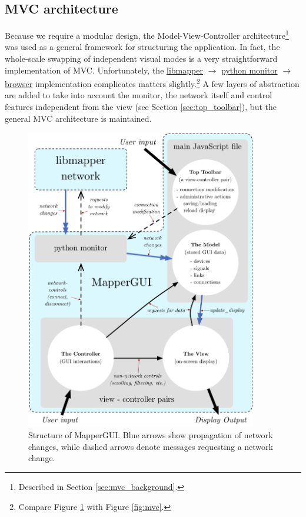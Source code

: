 	\subsection{MVC architecture} %
	\label{sec:mvc_architecture}

Because we require a modular design, the Model-View-Controller architecture\footnote{Described in Section \ref{sec:mvc_background}.} was used as a general framework for structuring the application. In fact, the whole-scale swapping of independent visual modes is a very straightforward implementation of MVC. Unfortunately, the \url{libmapper} $\rightarrow$ \url{python monitor} $\rightarrow$ \url{browser} implementation complicates matters slightly.\footnote{Compare Figure \ref{fig:mapper_network} with Figure \ref{fig:mvc}.} A few layers of abstraction are added to take into account the monitor, the network itself and control features independent from the view (see Section \ref{sec:top_toolbar}), but the general MVC architecture is maintained.

\begin{figure}
\centering
	\includegraphics[width=0.9\textwidth]{figures/mapper_network}
\caption{Structure of MapperGUI. Blue arrows show propagation of network changes, while dashed arrows denote messages requesting a network change.}
\label{fig:mapper_network}
\end{figure}


